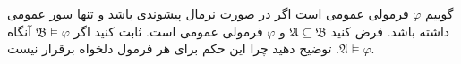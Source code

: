 گوییم 
$\varphi$
فرمولی عمومی است اگر در صورت نرمال پیشوندی باشد و تنها سور عمومی داشته باشد. فرض کنید
$\mathfrak{A}\subseteq\mathfrak{B}$
و
$\varphi$
فرمولی عمومی است. ثابت کنید اگر
$\mathfrak{B}\models\varphi$
آنگاه
$\mathfrak{A}\models\varphi$. توضیح دهید چرا این حکم برای هر فرمول دلخواه برقرار نیست.